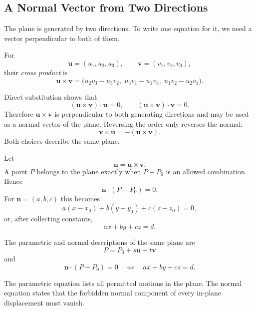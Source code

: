 \subsection{A Normal Vector from Two Directions}

The plane is generated by two directions. To write one equation for it, we need
a vector perpendicular to both of them.

\begin{definitionbox}
For
\[
\mathbf u=(u_1,u_2,u_3),
\qquad
\mathbf v=(v_1,v_2,v_3),
\]
their \emph{cross product} is
\[
\boxed{
\mathbf u\times\mathbf v
=
\bigl(
 u_2v_3-u_3v_2,
\;u_3v_1-u_1v_3,
\;u_1v_2-u_2v_1
\bigr)
}.
\]
\end{definitionbox}

Direct substitution shows that
\[
(\mathbf u\times\mathbf v)\cdot\mathbf u=0,
\qquad
(\mathbf u\times\mathbf v)\cdot\mathbf v=0.
\]
Therefore $\mathbf u\times\mathbf v$ is perpendicular to both generating
directions and may be used as a normal vector of the plane. Reversing the order
only reverses the normal:
\[
\mathbf v\times\mathbf u=-(\mathbf u\times\mathbf v).
\]
Both choices describe the same plane.

\begin{derivationbox}
Let
\[
\mathbf n=\mathbf u\times\mathbf v.
\]
A point $P$ belongs to the plane exactly when $P-P_0$ is an allowed
combination. Hence
\[
\mathbf n\cdot(P-P_0)=0.
\]
For $\mathbf n=(a,b,c)$ this becomes
\[
a(x-x_0)+b(y-y_0)+c(z-z_0)=0,
\]
or, after collecting constants,
\[
ax+by+cz=d.
\]
\end{derivationbox}

\begin{theorembox}
The parametric and normal descriptions of the same plane are
\[
\boxed{
P=P_0+s\mathbf u+t\mathbf v
}
\]
and
\[
\boxed{
\mathbf n\cdot(P-P_0)=0
\quad\Longleftrightarrow\quad
ax+by+cz=d
}.
\]
\end{theorembox}

\begin{interpretationbox}
The parametric equation lists all permitted motions in the plane. The normal
equation states that the forbidden normal component of every in-plane
displacement must vanish.
\end{interpretationbox}

